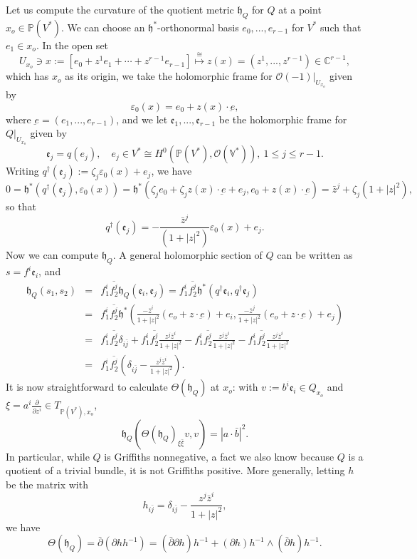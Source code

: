 \documentclass[12pt,hidelinks]{amsart}
\newcommand{\cO}{{\mathcal O}}
\newcommand{\fe}{{\mathfrak e}}
\newcommand{\fh}{{\mathfrak h}}
\newcommand{\ve}{\varepsilon}
\newcommand{\bbC}{{\mathbb C}}
\newcommand{\bbP}{{\mathbb P}}
\newcommand{\bbV}{{\mathbb V}}
\newcommand{\di}{\partial}
\newcommand{\dbar}{\bar \partial}
\begin{document}
Let us compute the curvature of the quotient metric $\fh_Q$ for $Q$ at a point $x_o \in \bbP(V^*)$.  We can choose an $\fh^*$-orthonormal basis $e_0,..., e_{r-1}$ for $V^*$ such that $e_1 \in x_o$.  In the open set
\[
U_{x_o} \ni x := [e_0+ z^1e_1 + \cdots + z^{r-1} e_{r-1}] \stackrel{\cong}{\mapsto} z(x) = (z^1,..., z^{r-1}) \in \bbC ^{r-1},
\]
which has $x_o$ as its origin, we take the holomorphic frame for $\cO (-1)|_{U_{x_o}}$ given by 
\[
\ve _0(x) = e_0 + z(x) \cdot \underbar{e},
\]
where $\underbar{e} = (e_1,..., e_{r-1})$, and we let $\fe_1,..., \fe_{r-1}$ be the holomorphic frame for $Q|_{U_{x_o}}$ given by 
\[\label{E-frame-defn}
\fe_j = q(e_j), \quad e_j \in V^* \cong H^0(\bbP(V^*), \cO (\bbV^*)), \ 1 \le j \le r-1.
\]
Writing $q ^{\dagger}(\fe_j) := \zeta _j \ve _0 (x) + e_j$, we have
\[
0 = \fh^* (q ^{\dagger}(\fe_j), \ve _0(x)) = \fh^* ( \zeta _j e_0 + \zeta _j z(x) \cdot \underbar{e} + e_j, e_0 + z(x) \cdot \underbar{e} ) = \bar z^j + \zeta _j (1+ |z|^2),
\]
so that 
\[
q^{\dagger}(\fe_j) = - \frac{\bar z ^j}{(1+ |z|^2)}\ve _0(x) + e_j.
\]
Now we can compute $\fh _Q$.  A general holomorphic section of $Q$ can be written as $s = f^i \fe_i$, and 
\begin{eqnarray*}
\fh _Q (s_1, s_2) &=& f_1^i \overline{f_2^j} \fh _Q(\fe_i, \fe_j) =f_1^i \overline{f_2^j} \fh^* (q^{\dagger}\fe_i,q^{\dagger}\fe_j) \\
& = & f_1^i \overline{f_2^j} \fh^* \left (\frac{- \bar z^i}{1+|z|^2}(e_o +z \cdot \underbar{e}) + e_i , \frac{- \bar z^j}{1+|z|^2}(e_o +z \cdot \underbar{e}) + e_j \right ) \\
&=&f_1^i \overline{f_2^j}  \delta _{i \bar j} +  f_1^i \overline{f_2^j} \frac{z^j \bar z ^i}{1+|z|^2} - f_1^i \overline{f_2^j} \frac{z^j \bar z ^i}{1+|z|^2} - f_1^i \overline{f_2^j} \frac{z^j \bar z ^i}{1+|z|^2}\\
&=& f_1^i \overline{f_2^j} \left (  \delta _{i \bar j}  -  \frac{z^j \bar z ^i}{1+|z|^2} \right ).
\end{eqnarray*}
It is now straightforward to calculate $\Theta (\fh _Q)$ at $x_o$: with $v := b^i \fe_i \in Q_{x_o}$ and $\xi = a^i \frac{\di}{\di z^i} \in T_{\bbP(V^*), x_o}$,  
\[
\fh _Q(\Theta (\fh _Q)_{\xi \bar \xi}v , v) = |a \cdot \bar b|^2.
\]
In particular, while $Q$ is Griffiths nonnegative, a fact we also know because $Q$ is a quotient of a trivial bundle, it is not Griffiths positive.  More generally, letting $h$ be the matrix with 
\[
h_{i \bar j} = \delta _{i \bar j} - \frac{z ^j \bar z ^i}{1+|z|^2},
\]
we have 
\[
\Theta (\fh _Q)= \dbar (\di h h^{-1}) =(\dbar \di h)h^{-1}+ (\di h) h^{-1} \wedge (\dbar h) h^{-1}.
\] 
\end{document}
